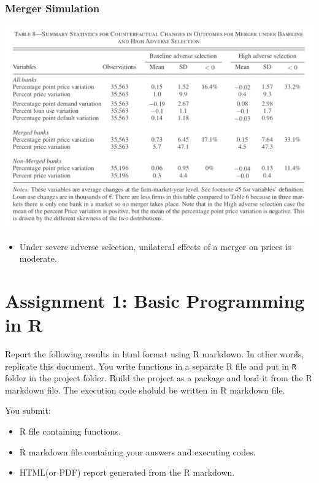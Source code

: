 \documentclass[
]{book}
\providecommand{\tightlist}{%
  \setlength{\itemsep}{0pt}\setlength{\parskip}{0pt}}
\begin{document}
\hypertarget{merger-simulation-2}{%
\subsection{Merger Simulation}\label{merger-simulation-2}}

\includegraphics{figuretable/Crawford_2018_Table8.png}

\begin{itemize}
\tightlist
\item
  Under severe adverse selection, unilateral effects of a merger on prices is moderate.
\end{itemize}

\hypertarget{assignment1}{%
\chapter{Assignment 1: Basic Programming in R}\label{assignment1}}

Report the following results in html format using R markdown. In other words, replicate this document. You write functions in a separate R file and put in \texttt{R} folder in the project folder. Build the project as a package and load it from the R markdown file. The execution code sholuld be written in R markdown file.

You submit:

\begin{itemize}
\tightlist
\item
  R file containing functions.
\item
  R markdown file containing your answers and executing codes.
\item
  HTML(or PDF) report generated from the R markdown.
\end{itemize}
\end{document}
